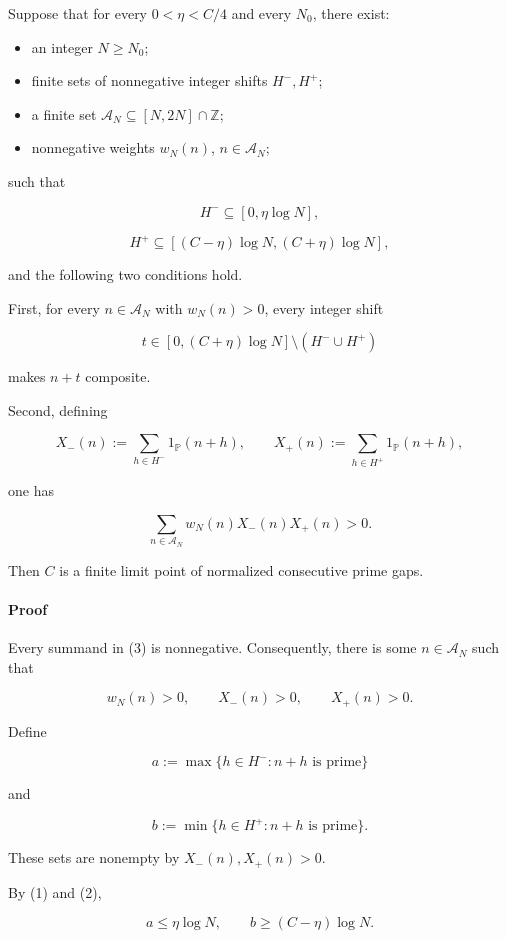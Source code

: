 Suppose that for every \(0<\eta<C/4\) and every \(N_0\), there exist:

\begin{itemize}
\item an integer \(N\ge N_0\);
\item finite sets of nonnegative integer shifts \(H^-,H^+\);
\item a finite set \(\mathcal A_N\subseteq[N,2N]\cap\mathbb Z\);
\item nonnegative weights \(w_N(n)\), \(n\in\mathcal A_N\);
\end{itemize}

such that

\[
H^-\subseteq[0,\eta\log N],
\tag{1}
\]

\[
H^+\subseteq[(C-\eta)\log N,(C+\eta)\log N],
\tag{2}
\]

and the following two conditions hold.

First, for every \(n\in\mathcal A_N\) with \(w_N(n)>0\), every integer shift

\[
t\in[0,(C+\eta)\log N]\setminus(H^-\cup H^+)
\]

makes \(n+t\) composite.

Second, defining

\[
X_-(n):=\sum_{h\in H^-}1_{\mathbb P}(n+h),
\qquad
X_+(n):=\sum_{h\in H^+}1_{\mathbb P}(n+h),
\]

one has

\[
\boxed{
\sum_{n\in\mathcal A_N}w_N(n)X_-(n)X_+(n)>0.
}
\tag{3}
\]

Then \(C\) is a finite limit point of normalized consecutive prime gaps.

\paragraph{Proof}

Every summand in (3) is nonnegative. Consequently, there is some \(n\in\mathcal A_N\) such that

\[
w_N(n)>0,\qquad X_-(n)>0,\qquad X_+(n)>0.
\]

Define

\[
a:=\max\{h\in H^-:n+h\text{ is prime}\}
\]

and

\[
b:=\min\{h\in H^+:n+h\text{ is prime}\}.
\]

These sets are nonempty by \(X_-(n),X_+(n)>0\).

By (1) and (2),

\[
a\le\eta\log N,
\qquad
b\ge(C-\eta)\log N.
\]

